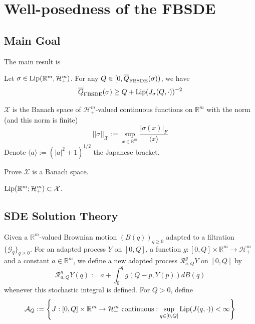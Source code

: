 \section{Well-posedness of the FBSDE}

\subsection{Main Goal}

The main result is
\begin{theorem}
    Let $\sigma \in \text{Lip}(\mathbb{R}^m,\mathcal{H}_+^m)$. For any $Q\in [0,\overline{Q}_{\text{FBSDE}}(\sigma))$, we have
    \[\overline{Q}_{\text{FBSDE}}(\sigma) \geq Q + \text{Lip}(J_{\sigma}(Q,\cdot))^{-2}\] 
\end{theorem}

\begin{definition}
    $\mathcal{X}$ is the Banach space of $\mathcal{H}_+^m$-valued continuous functions on $\mathbb{R}^m$ with the norm (and this norm is finite)
    \[
    ||\sigma||_{\mathcal{X}}  := \sup_{x\in\mathbb{R}^m}\dfrac{|\sigma(x)|_F}{\langle x\rangle} 
    \]
    Denote $\langle a\rangle := (|a|^2+1)^{1/2}$ the Japanese bracket.
\end{definition}

\begin{proposition}
    Prove $\mathcal{X}$ is a Banach space.
\end{proposition}

\begin{proposition}
    $\text{Lip}(\mathbb{R}^m;\mathcal{H}_+^m) \subset \mathcal{X}$.
\end{proposition}

\subsection{SDE Solution Theory}

\begin{definition}
    Given a $\mathbb{R}^m$-valued Brownian motion $(B(q))_{q\geq 0}$ adapted to a filtration $\{\mathscr{G}_q\}_{q\geq 0}$. For an adapted process $Y$ on $[0,Q]$, a function $g:[0,Q] \times \mathbb{R}^m \to \mathcal{H}_+^m$ and a constant $a\in\mathbb{R}^m$, we define a new adapted process $\mathcal{R}^g_{a,Q}Y$ on $[0,Q]$ by
    \[\mathcal{R}^g_{a,Q}Y(q):= a + \int_0^q g(Q-p,Y(p))dB(q)\]
    whenever this stochastic integral is defined. For $Q>0$, define
    \[
    \mathcal{A}_Q:=\left\{J:[0,Q]\times \mathbb{R}^m \to \mathcal{H}_+^m\text{ continuous}: \sup_{q\in [0,Q]}\text{Lip}(J(q,\cdot))<\infty\right\}
    \]
\end{definition}

